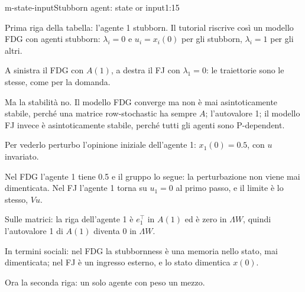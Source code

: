 \begin{slidedue}{m-state-input}{Stubborn agent: state or input}{1:15}
  \begin{discorso}
    \item {\color{blue}Prima riga della tabella: l'agente 1 stubborn.} Il tutorial {\color{red} } {\color{blue}riscrive così} un modello FDG con agenti {\color{red}      } {\color{blue}stubborn:} $\lambda_i=0$ e $u_i=x_i(0)$ per gli {\color{red}} stubborn, $\lambda_i=1$ per gli altri.
    \item A sinistra il FDG con $A(1)$, a destra il FJ con $\lambda_1=0$: le traiettorie sono le {\color{red}} {\color{blue}stesse, come per la domanda.}
    \item Ma la stabilità no. Il modello FDG converge ma non è mai asintoticamente stabile, perché {\color{red} } {\color{blue}una matrice row-stochastic ha} sempre {\color{red}  } {\color{red}$A$;} {\color{blue}l'autovalore 1;} il modello FJ invece è asintoticamente stabile, {\color{red}   } {\color{blue}perché tutti gli agenti sono P-dependent.}
    \item \clic Per vederlo perturbo l'opinione iniziale dell'agente 1: $x_1(0)=0.5$, con $u$ invariato.
    \item Nel FDG l'agente 1 tiene 0.5 e il gruppo lo segue: la perturbazione non viene mai dimenticata. Nel FJ l'agente 1 torna su $u_1=0$ al primo passo, e il limite è lo stesso, $Vu$.
    \item Sulle matrici: la riga dell'agente 1 è $e_1^\top$ in $A(1)$ ed è zero in $\Lambda W$, quindi l'autovalore 1 di $A(1)$ diventa 0 in $\Lambda W$.
    \item In termini sociali: nel FDG la stubbornness è una memoria nello stato, mai dimenticata; nel FJ è un ingresso esterno, e lo stato dimentica $x(0)$.
    \item {\color{blue}Ora la seconda riga: un solo agente con peso un mezzo.}
    \item {\color{red}      }
  \end{discorso}
\end{slidedue}

